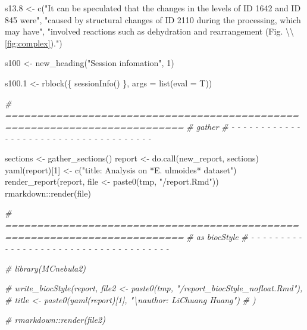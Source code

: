 \documentclass[
]{article}
\newenvironment{Shaded}{\begin{snugshade}}{\end{snugshade}}
\newcommand{\AttributeTok}[1]{\textcolor[rgb]{0.77,0.63,0.00}{#1}}
\newcommand{\CommentTok}[1]{\textcolor[rgb]{0.56,0.35,0.01}{\textit{#1}}}
\newcommand{\DecValTok}[1]{\textcolor[rgb]{0.00,0.00,0.81}{#1}}
\newcommand{\FloatTok}[1]{\textcolor[rgb]{0.00,0.00,0.81}{#1}}
\newcommand{\FunctionTok}[1]{\textcolor[rgb]{0.00,0.00,0.00}{#1}}
\newcommand{\NormalTok}[1]{#1}
\newcommand{\OtherTok}[1]{\textcolor[rgb]{0.56,0.35,0.01}{#1}}
\newcommand{\SpecialCharTok}[1]{\textcolor[rgb]{0.00,0.00,0.00}{#1}}
\newcommand{\StringTok}[1]{\textcolor[rgb]{0.31,0.60,0.02}{#1}}
\begin{document}
\begin{Shaded}
\begin{Highlighting}[]
\NormalTok{s13}\FloatTok{.8} \OtherTok{\textless{}{-}} \FunctionTok{c}\NormalTok{(}\StringTok{"It can be speculated that the changes in the levels of ID 1642 and ID 845 were"}\NormalTok{,}
  \StringTok{"caused by structural changes of ID 2110 during the processing, which may have"}\NormalTok{,}
  \StringTok{"involved reactions such as dehydration and rearrangement (Fig. }\SpecialCharTok{\textbackslash{}\textbackslash{}}\StringTok{\ref{fig:complex})."}\NormalTok{)}

\NormalTok{s100 }\OtherTok{\textless{}{-}} \FunctionTok{new\_heading}\NormalTok{(}\StringTok{"Session infomation"}\NormalTok{, }\DecValTok{1}\NormalTok{)}

\NormalTok{s100}\FloatTok{.1} \OtherTok{\textless{}{-}} \FunctionTok{rblock}\NormalTok{(\{}
  \FunctionTok{sessionInfo}\NormalTok{()}
\NormalTok{\}, }\AttributeTok{args =} \FunctionTok{list}\NormalTok{(}\AttributeTok{eval =}\NormalTok{ T))}
\end{Highlighting}
\end{Shaded}

\begin{Shaded}
\begin{Highlighting}[]
\CommentTok{\# ==========================================================================}
\CommentTok{\# gather}
\CommentTok{\# {-} {-} {-} {-} {-} {-} {-} {-} {-} {-} {-} {-} {-} {-} {-} {-} {-} {-} {-} {-} {-} {-} {-} {-} {-} {-} {-} {-} {-} {-} {-} {-} {-} {-} {-} {-} {-}}

\NormalTok{sections }\OtherTok{\textless{}{-}} \FunctionTok{gather\_sections}\NormalTok{()}
\NormalTok{report }\OtherTok{\textless{}{-}} \FunctionTok{do.call}\NormalTok{(new\_report, sections)}
\FunctionTok{yaml}\NormalTok{(report)[}\DecValTok{1}\NormalTok{] }\OtherTok{\textless{}{-}} \FunctionTok{c}\NormalTok{(}\StringTok{"title: Analysis on *E. ulmoides* dataset"}\NormalTok{)}
\FunctionTok{render\_report}\NormalTok{(report, file }\OtherTok{\textless{}{-}} \FunctionTok{paste0}\NormalTok{(tmp, }\StringTok{"/report.Rmd"}\NormalTok{))}
\NormalTok{rmarkdown}\SpecialCharTok{::}\FunctionTok{render}\NormalTok{(file)}
\end{Highlighting}
\end{Shaded}

\begin{Shaded}
\begin{Highlighting}[]
\CommentTok{\# ==========================================================================}
\CommentTok{\# as biocStyle}
\CommentTok{\# {-} {-} {-} {-} {-} {-} {-} {-} {-} {-} {-} {-} {-} {-} {-} {-} {-} {-} {-} {-} {-} {-} {-} {-} {-} {-} {-} {-} {-} {-} {-} {-} {-} {-} {-} {-} {-}}

\CommentTok{\# library(MCnebula2)}

\CommentTok{\# write\_biocStyle(report, file2 \textless{}{-} paste0(tmp, "/report\_biocStyle\_nofloat.Rmd"),}
\CommentTok{\#   title \textless{}{-} paste0(yaml(report)[1], "\textbackslash{}nauthor: \textquotesingle{}LiChuang Huang\textquotesingle{}")}
\CommentTok{\# )}

\CommentTok{\# rmarkdown::render(file2)}
\end{Highlighting}
\end{Shaded}
\end{document}
